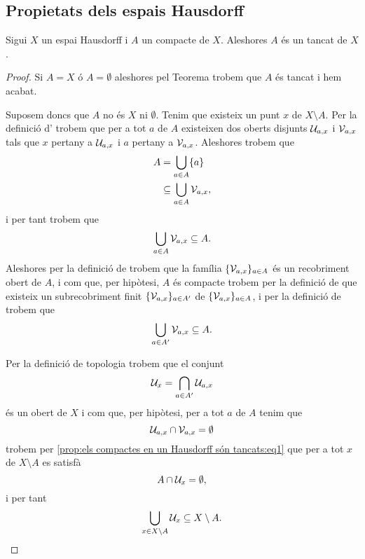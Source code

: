 \documentclass[../../Main.tex]{subfiles}
\begin{document}
	\subsection{Propietats dels espais Hausdorff}
	\begin{proposition}
		\label{prop:els compactes en un Hausdorff són tancats}
		Sigui \(X\) un espai Hausdorff i \(A\) un compacte de \(X\). Aleshores \(A\) és un tancat de \(X\).
		\begin{proof} %
			Si \(A=X\) ó \(A=\emptyset\) aleshores pel Teorema  trobem que \(A\) és tancat i hem acabat.
			
			Suposem doncs que \(A\) no és \(X\) ni \(\emptyset\). Tenim que existeix un punt \(x\) de \(X\setminus A\). Per la definició d' trobem que per a tot \(a\) de \(A\) existeixen dos oberts disjunts \(\mathcal{U}_{a,x}\) i \(\mathcal{V}_{a,x}\) tals que \(x\) pertany a \(\mathcal{U}_{a,x}\) i \(a\) pertany a \(\mathcal{V}_{a,x}\). Aleshores trobem que
			\begin{align*}
				A&=\bigcup_{a\in A}\{a\} \\
				&\subseteq\bigcup_{a\in A}\mathcal{V}_{a,x},
			\end{align*}
			i per tant trobem que
			\[
			    \bigcup_{a\in A}\mathcal{V}_{a,x}\subseteq A.
			\]
			Aleshores per la definició de  trobem que la família \(\{\mathcal{V}_{a,x}\}_{a\in A}\) és un recobriment obert de \(A\), i com que, per hipòtesi, \(A\) és compacte trobem per la definició de  que existeix un subrecobriment finit \(\{\mathcal{V}_{a,x}\}_{a\in A'}\) de \(\{\mathcal{V}_{a,x}\}_{a\in A}\), i per la definició de  trobem que
			\begin{equation}
				\label{prop:els compactes en un Hausdorff són tancats:eq1}
				\bigcup_{a\in A'}\mathcal{V}_{a,x}\subseteq A.
			\end{equation}
			
			Per la definició de topologia trobem que el conjunt
			\[
			    \mathcal{U}_{x}=\bigcap_{a\in A'}\mathcal{U}_{a,x}
			\]
			és un obert de \(X\) i com que, per hipòtesi, per a tot \(a\) de \(A\) tenim que
			\[
			    \mathcal{U}_{a,x}\cap\mathcal{V}_{a,x}=\emptyset
			\]
			trobem per \eqref{prop:els compactes en un Hausdorff són tancats:eq1} que per a tot \(x\) de \(X\setminus A\) es satisfà
			\[
			    A\cap\mathcal{U}_{x}=\emptyset,
			\]
			i per tant
			\[
			    \bigcup_{x\in X\setminus A}\mathcal{U}_{x}\subseteq X\setminus A.
			\]
			

\end{proof}
\end{proposition}
\end{document}
